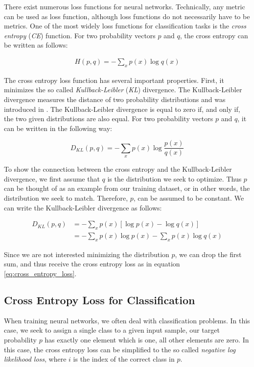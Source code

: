 There exist numerous loss functions for neural networks. Technically, any metric can be used as loss function, although loss functions do not necessarily have to be metrics. One of the most widely loss functions for classification tasks is the \textit{cross entropy} (\textit{CE}) function. For two  probability vectors $p$ and $q$, the cross entropy can be written as follows:

\begin{align}
H(p, q) = - \sum_{x} p(x) \log q(x)
\label{eq:cross_entropy_loss}
\end{align}

The cross entropy loss function has several important properties. First, it minimizes the so called \textit{Kullback-Leibler} (\textit{KL}) divergence. The Kullback-Leibler divergence measures the distance of two probability distributions and was introduced in \cite{kullback1951information}. The Kullback-Leibler divergence is equal to zero if, and only if, the two given distributions are also equal. For two probability vectors $p$ and $q$, it can be written in the following way:

\[
D_{KL}(p, q) = -\sum_{x} p(x) \log \frac{p(x)}{q(x)}
\]

To show the connection between the cross entropy and the Kullback-Leibler divergence, we first assume that $q$ is the distribution we seek to optimize. Thus $p$ can be thought of as an example from our training dataset, or in other words, the distribution we seek to match. Therefore, $p$, can be assumed to be constant. We can write the Kullback-Leibler divergence as follows: 

\begin{align*}
D_{KL}(p, q) &= - \sum_{x} p(x) \left[ \log p(x) - \log q(x) \right] \\
& = - \sum_{x} p(x) \log p(x) -\sum_{x} p(x) \log q(x)
\end{align*}

Since we are not interested minimizing the distribution $p$, we can drop the first sum, and thus receive the cross entropy loss as in equation \ref{eq:cross_entropy_loss}. 
\subsection{Cross Entropy Loss for Classification}
When training neural networks, we often deal with classification problems. In this case, we seek to assign a single class to a given input sample, our target probability $p$ has exactly one element which is one, all other elements are zero. In this case, the cross entropy loss can be simplified to the so called \textit{negative log likelihood loss}, where $i$ is the index of the correct class in $p$. 

